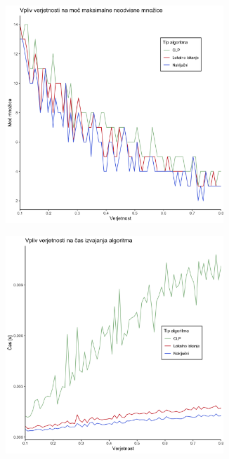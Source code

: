 \documentclass[a4paper, 12pt]{article}
\begin{document}
\begin{figure}[h!]
	\begin{center}
		\begin{subfigure}{0.45\textwidth}
		\begin{center}
			\includegraphics[width=0.9\textwidth]{R_koda/ver-moc.png}
	\end{center}
		\end{subfigure}
		\begin{subfigure}{0.45\textwidth}
		\begin{center}
			\includegraphics[width=0.9\textwidth]{R_koda/ver-cas.png}
	\end{center}
		\end{subfigure}
	\end{center}
	\end{figure}
\end{document}
